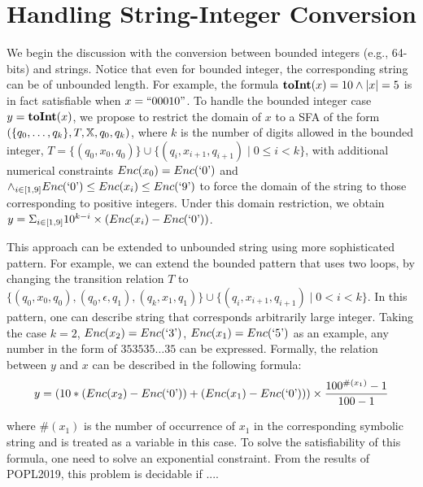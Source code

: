 \documentclass{llncs}
\begin{document}





\section{Handling String-Integer Conversion} \label{section:s2i}
We begin the discussion with the conversion between bounded integers (e.g., 64-bits) and strings. Notice that even for bounded integer, the corresponding string can be of unbounded length. For example, the formula $\mbox{\textbf{toInt}($x$)}=10 \wedge |x|=5$ is in fact satisfiable when $x=``00010"$. To handle the bounded integer case $y=\mbox{\textbf{toInt}($x$)}$, we propose to restrict the domain of $x$ to a SFA of the form $(\{q_0,\ldots,q_k\},T,\mbox{$\mathbb{X}$}, q_0,q_k)$, where $k$ is the number of digits allowed in the bounded integer, $T = \{(q_0,x_0,q_0)\} \cup \{(q_i,x_{i+1},q_{i+1})\mid 0\leq i <k\}$, with additional numerical constraints $Enc(x_0)=Enc(\mbox{`0'})$ and $\wedge_{i\in [1,9]} Enc(\mbox{`0'})\leq Enc(x_i) \leq Enc(\mbox{`9'})$ to force the domain of the string to those corresponding to positive integers. Under this domain restriction, we obtain $y=\Sigma_{i\in [1,9]} 10^{k-i}\times (Enc(x_i)-Enc(\mbox{`0'}))$.


This approach can be extended to unbounded string using more sophisticated pattern. For example, we can extend the bounded pattern that uses two loops, by changing the transition relation $T$ to $\{(q_0,x_0,q_0), (q_0,\epsilon,q_1), (q_k,x_1,q_1)\} \cup \{(q_i,x_{i+1},q_{i+1})\mid 0< i <k\}$. In this pattern, one can describe string that corresponds arbitrarily large integer. Taking the case $k=2$, $Enc(x_2)=Enc(\mbox{`3'})$, $Enc(x_1)=Enc(\mbox{`5'})$ as an example, any number in the form of $353535\ldots35$ can be expressed. Formally, the relation between $y$ and $x$ can be described in the following formula:
$$y= (10*(Enc(x_2)-Enc(\mbox{`0'}))+(Enc(x_1)-Enc(\mbox{`0'})))\times \frac{100^{\#(x_1)}-1}{100-1}$$

where $\#(x_1)$ is the number of occurrence of $x_1$ in the corresponding symbolic string and is treated as a variable in this case. To solve the satisfiability of this formula, one need to solve an exponential constraint. From the results of POPL2019, this problem is decidable if ....
\end{document}
